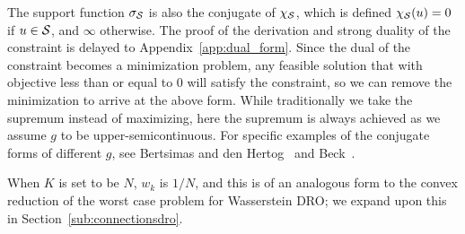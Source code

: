 The support function $\sigma_ {\mathcal{S}}$ is also the conjugate of $\chi_ {\mathcal{S}}$, which is defined $\chi_{\mathcal{S}}(u) = 0$ if $u \in  \mathcal{S}$, and $\infty$ otherwise.
The proof of the derivation and strong duality of the constraint is delayed to Appendix~\ref{app:dual_form}.
Since the dual of the constraint becomes a minimization problem, any feasible solution that with objective less than or equal to $0$ will satisfy the constraint, so we can remove the minimization to arrive at the above form.
While traditionally we take the supremum instead of maximizing, here the supremum is always achieved as we assume $g$ to be upper-semicontinuous.
For specific examples of the conjugate forms of different $g$, see Bertsimas and den Hertog~\cite[Section 2.5]{robustadaptopt} and Beck~\cite[Chapter 4]{amirbeck}.

When $K$ is set to be $N$, $w_k$ is $1/N$, and this is of an analogous form to the convex reduction of the worst case problem for Wasserstein \gls{DRO}; we expand upon this in Section~\ref{sub:connectionsdro}.



